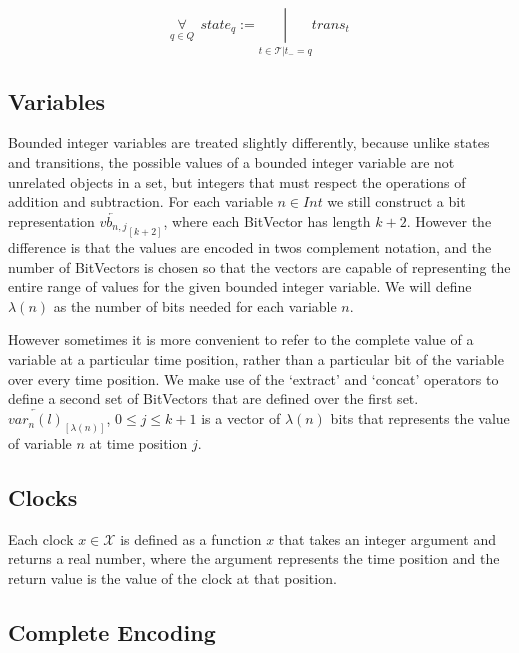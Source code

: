 \documentclass[a4paper,12pt]{article}
\newcommand*\BitOr{\mathbin{|}}
\begin{document}
\[\underset{q \in Q}{\forall}\ \ state_q := \underset{t \in \mathcal{T}|t_{-} = q}{\BitOr}trans_t\]

\subsection{Variables}\label{encoding-variables}

Bounded integer variables are treated slightly differently, because unlike
states and transitions, the possible values of a bounded integer variable are
not unrelated objects in a set, but integers that must respect the operations of
addition and subtraction. For each variable \(n \in Int\) we still construct a
bit representation \(\overleftarrow{vb_{n,j}}_{[k+2]}\), where each BitVector
has length \(k+2\). However the difference is that the values are encoded in twos
complement notation, and the number of BitVectors is chosen so that the vectors
are capable of representing the entire range of values for the given bounded
integer variable. We will define \(\lambda(n)\) as the number of bits needed for
each variable \(n\).

However sometimes it is more convenient to refer to the complete value of a
variable at a particular time position, rather than a particular bit of the
variable over every time position. We make use of the `extract' and
`concat' operators to define a second set of BitVectors that are defined over
the first set. \(\overleftarrow{var_{n}(l)}_{[\lambda(n)]}\), \(0 \leq j \leq
k+1\) is a vector of \(\lambda(n)\) bits that represents the value of variable
\(n\) at time position \(j\).


\subsection{Clocks}\label{encoding-clocks}

Each clock \(x \in \mathcal{X}\) is defined as a function \(x\) that takes
an integer argument and returns a real number, where the argument represents the
time position and the return value is the value of the clock at that position.

\subsection{Complete Encoding}\label{complete-encoding}
\end{document}
